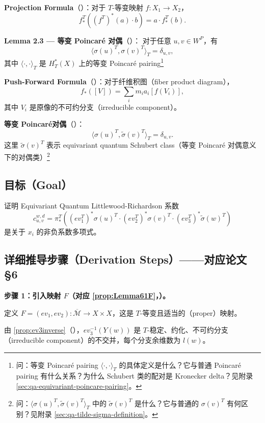 \textbf{Projection Formula}（\cite[(1)]{Mihalcea}）：对于 $T$-等变映射 $f: X_1 \to X_2$，
$$f_*^T\left((f^T)^*(a) \cdot b\right) = a \cdot f_*^T(b).$$

\textbf{Lemma 2.3 — 等变 Poincaré 对偶}（\cite[Lemma 2.3]{Mihalcea}）：
对于任意 $u, v \in W^P$，有
$$\langle \sigma(u)^T, \sigma(v)^T \rangle_T = \delta_{u,v},$$
其中 $\langle \cdot, \cdot \rangle_T$ 是 $H_T^*(X)$ 上的等变 Poincaré pairing\footnote{问：等变 Poincaré pairing $\langle \cdot, \cdot \rangle_T$ 的具体定义是什么？它与普通 Poincaré pairing 有什么关系？为什么 Schubert 类的配对是 Kronecker delta？见附录 \cref{sec:qa-equivariant-poincare-pairing}。}
\label{prop:Lemma23Poincare}

\textbf{Push-Forward Formula}（\cite[(2)]{Mihalcea}）：对于纤维积图（fiber product diagram），
$$f_*([V]) = \sum_i m_i a_i [f(V_i)],$$
其中 $V_i$ 是原像的不可约分支（irreducible component）。

\textbf{等变 Poincaré对偶}（\cite[Proposition 3.1]{Mihalcea}）：
$$\langle \sigma(u)^T, \widetilde{\sigma}(v)^T \rangle_T = \delta_{u,v}.$$
这里 $\widetilde{\sigma}(v)^T$ 表示 equivariant quantum Schubert class（等变 Poincaré 对偶意义下的对偶类）\footnote{问：$\langle \sigma(u)^T, \widetilde{\sigma}(v)^T \rangle_T$ 中的 $\widetilde{\sigma}(v)^T$ 是什么？它与普通的 $\sigma(v)^T$ 有何区别？见附录 \cref{sec:qa-tilde-sigma-definition}。}

\subsection{目标（Goal）}

证明 Equivariant Quantum Littlewood-Richardson 系数
$$c_{u,v}^{w,d} = \pi_*^T\left((ev_1^T)^* \sigma(u)^T \cdot (ev_2^T)^* \sigma(v)^T \cdot (ev_3^T)^* \widetilde{\sigma}(w)^T\right)$$
是关于 $x_i$ 的非负系数多项式。

\subsection{详细推导步骤（Derivation Steps）——对应论文 \S 6}

\textbf{步骤 1：引入映射 $F$（对应 \cref{prop:Lemma61F}，\cite[Lemma 6.1]{Mihalcea}）。}

定义 $F = (ev_1, ev_2) : \overline{\mathcal{M}} \to X \times X$，这是 $T$-等变且适当的（proper）映射。

由 \cref{prop:ev3inverse}（\cite[Lemma 6.4]{Mihalcea}），$ev_3^{-1}(Y(w))$ 是 $T$-稳定、约化、不可约分支（irreducible component）的不交并，每个分支余维数为 $l(w)$。

